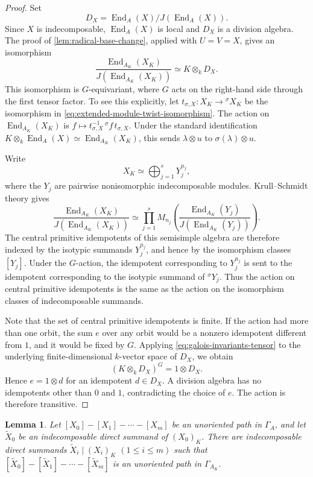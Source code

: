 \documentclass[11pt,letterpaper,reqno]{amsart}
\newtheorem{lemma}[lemma]{Lemma}
\theoremstyle{definition}
\DeclareMathOperator{\End}{End}
\begin{document}
\begin{proof}
Set
\[
D_X=\End_A(X)/J(\End_A(X)).
\]
Since $X$ is indecomposable, $\End_A(X)$ is local and $D_X$ is a division
algebra.  The proof of \cref{lem:radical-base-change}, applied with
$U=V=X$, gives an isomorphism
\begin{equation*}\label{eq:semisimple-end-base-change}
\frac{\End_{A_K}(X_K)}{J(\End_{A_K}(X_K))}
 \simeq K\otimes_kD_X.
\end{equation*}
This isomorphism is $G$-equivariant, where $G$ acts on the right-hand side
through the first tensor factor.  To see this explicitly, let
$t_{\sigma,X}:X_K\to{}^\sigma X_K$ be the isomorphism in
\eqref{eq:extended-module-twist-isomorphism}.  The action on
$\End_{A_K}(X_K)$ is $f\longmapsto t_{\sigma,X}^{-1}\,{}^\sigma f\,t_{\sigma,X}$. Under the standard identification
$K\otimes_k\End_A(X)\simeq\End_{A_K}(X_K)$, this sends
$\lambda\otimes u$ to $\sigma(\lambda)\otimes u$.

Write
\[
X_K\simeq\bigoplus_{j=1}^sY_j^{n_j},
\]
where the $Y_j$ are pairwise nonisomorphic indecomposable modules.
Krull--Schmidt theory gives
\[
\frac{\End_{A_K}(X_K)}{J(\End_{A_K}(X_K))}
 \simeq
 \prod_{j=1}^s
 M_{n_j}\left(
 \frac{\End_{A_K}(Y_j)}{J(\End_{A_K}(Y_j))}
 \right).
\]
The central primitive idempotents of this semisimple algebra are therefore
indexed by the isotypic summands $Y_j^{n_j}$, and hence by the isomorphism
classes $[Y_j]$.  Under the $G$-action, the idempotent corresponding to
$Y_j^{n_j}$ is sent to the idempotent corresponding to the isotypic summand
of ${}^\sigma Y_j$.  Thus the action on central primitive idempotents is the
same as the action on the isomorphism classes of indecomposable summands.

Note that the set of central primitive idempotents is finite. If the action had more than one orbit, the sum $e$ over any orbit would be a nonzero idempotent different from $1$, and it would be fixed by $G$. 
Applying \eqref{eq:galois-invariants-tensor} to the underlying finite-dimensional $k$-vector space of $D_X$, we obtain
\[
(K\otimes_kD_X)^G=1\otimes D_X.
\]
Hence $e=1\otimes d$ for an idempotent $d\in D_X$.  A division algebra has
no idempotents other than $0$ and $1$, contradicting the choice of $e$.
The action is therefore transitive.
\end{proof}



\begin{lemma}\label{lem:path-lifting}
Let $[X_0]-[X_1]-\cdots-[X_m]$ be an unoriented path in $\Gamma_A$, and let $\widetilde X_0$ be an indecomposable direct summand of $(X_0)_K$. There are indecomposable direct summands $\widetilde X_i\mid(X_i)_K$ $(1\leq i\leq m)$ such that $[\widetilde X_0]-[\widetilde X_1]-\cdots-[\widetilde X_m]$ is an unoriented path in $\Gamma_{A_K}$.
\end{lemma}
\end{document}
